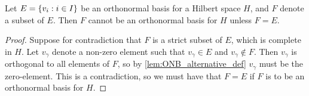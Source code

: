 \documentclass[../thesis.tex]{subfiles}
\begin{document}
\begin{lemma}\label{lem:onb_direct_subset}
    Let $E = \{v_i: i \in I\}$ be an orthonormal basis for a Hilbert space $H$, and $F$ denote a subset of $E$. Then $F$ cannot be an orthonormal basis for $H$ unless $F = E$.
\end{lemma}
\begin{proof}
    Suppose for contradiction that $F$ is a strict subset of $E$, which is complete in $H$. Let $v_\gamma$ denote a non-zero element such that $v_{\gamma}\in E$ and $v_{\gamma}\notin F$. Then $v_{\gamma}$ is orthogonal to all elements of $F$, so by \cref{lem:ONB_alternative_def} $v_{\gamma}$ must be the zero-element. This is a contradiction, so we must have that $F=E$ if $F$ is to be an orthonormal basis for $H$.
\end{proof}
\end{document}
